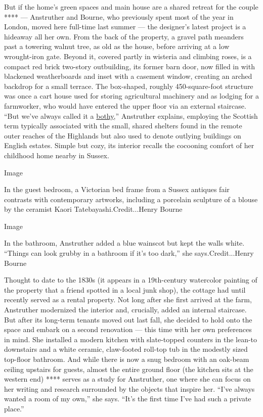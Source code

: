 But if the home's green spaces and main house are a shared retreat for
the couple **** --- Anstruther and Bourne, who previously spent most of
the year in London, moved here full-time last summer --- the designer's
latest project is a hideaway all her own. From the back of the property,
a gravel path meanders past a towering walnut tree, as old as the house,
before arriving at a low wrought-iron gate. Beyond it, covered partly in
wisteria and climbing roses, is a compact red brick two-story
outbuilding, its former barn door, now filled in with blackened
weatherboards and inset with a casement window, creating an arched
backdrop for a small terrace. The box-shaped, roughly 450-square-foot
structure was once a cart house used for storing agricultural machinery
and as lodging for a farmworker, who would have entered the upper floor
via an external staircase. ``But we've always called it a
\href{https://www.nytimes.com/2019/01/21/travel/in-search-of-britains-bothies.html}{bothy},''
Anstruther explains, employing the Scottish term typically associated
with the small, shared shelters found in the remote outer reaches of the
Highlands but also used to denote outlying buildings on English estates.
Simple but cozy, its interior recalls the cocooning comfort of her
childhood home nearby in Sussex.

Image

In the guest bedroom, a Victorian bed frame from a Sussex antiques fair
contrasts with contemporary artworks, including a porcelain sculpture of
a blouse by the ceramist Kaori Tatebayashi.Credit...Henry Bourne

Image

In the bathroom, Anstruther added a blue wainscot but kept the walls
white. ``Things can look grubby in a bathroom if it's too dark,'' she
says.Credit...Henry Bourne

Thought to date to the 1830s (it appears in a 19th-century watercolor
painting of the property that a friend spotted in a local junk shop),
the cottage had until recently served as a rental property. Not long
after she first arrived at the farm, Anstruther modernized the interior
and, crucially, added an internal staircase. But after its long-term
tenants moved out last fall, she decided to hold onto the space and
embark on a second renovation --- this time with her own preferences in
mind. She installed a modern kitchen with slate-topped counters in the
lean-to downstairs and a white ceramic, claw-footed roll-top tub in the
modestly sized top-floor bathroom. And while there is now a snug bedroom
with an oak-beam ceiling upstairs for guests, almost the entire ground
floor (the kitchen sits at the western end) **** serves as a study for
Anstruther, one where she can focus on her writing and research
surrounded by the objects that inspire her. ``I've always wanted a room
of my own,'' she says. ``It's the first time I've had such a private
place.''

